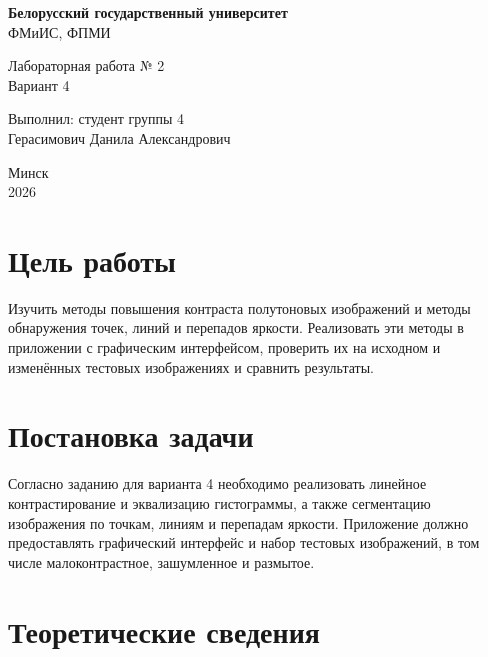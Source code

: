 \documentclass[12pt,a4paper]{article}
\begin{document}
\begin{titlepage}
    \begin{center}
        \textbf{Белорусский государственный университет}\\\relax
        ФМиИС, ФПМИ\\[0.5cm]

        \vfill

        {\large Лабораторная работа № 2}\\[0.5cm]
        {\large Вариант 4}

        \vfill
    \end{center}

    \begin{flushright}
        Выполнил: студент группы 4\\\relax
        Герасимович Данила Александрович\\
    \end{flushright}

    \vfill

    \begin{center}
        Минск\\
        2026
    \end{center}
\end{titlepage}

\tableofcontents
\clearpage

\section{Цель работы}

Изучить методы повышения контраста полутоновых изображений и методы
обнаружения точек, линий и перепадов яркости. Реализовать эти методы в
приложении с графическим интерфейсом, проверить их на исходном и изменённых
тестовых изображениях и сравнить результаты.

\section{Постановка задачи}

Согласно заданию для варианта 4 необходимо реализовать линейное
контрастирование и эквализацию гистограммы, а также сегментацию изображения
по точкам, линиям и перепадам яркости. Приложение должно предоставлять
графический интерфейс и набор тестовых изображений, в том числе
малоконтрастное, зашумленное и размытое.

\section{Теоретические сведения}
\end{document}
